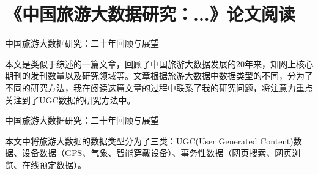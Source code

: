 \documentclass[10pt]{beamer}
\begin{document}
\section{《中国旅游大数据研究：...》论文阅读}%
\begin{frame}{\normalsize{中国旅游大数据研究：二十年回顾与展望}}
    \par 本文是类似于综述的一篇文章，回顾了中国旅游大数据发展的20年来，知网上核心期刊的发刊数量以及研究领域等。文章根据旅游大数据中数据类型的不同，分为了不同的研究方法，我在阅读这篇文章的过程中联系了我的研究问题，将注意力重点关注到了UGC数据的研究方法中。
\end{frame}
\begin{frame}{\normalsize{中国旅游大数据研究：二十年回顾与展望}}
\small{本文中将旅游大数据的数据类型分为了三类：UGC(User Generated Content)数据、设备数据（GPS、气象、智能穿戴设备）、事务性数据（网页搜索、网页浏览、在线预定数据）。

}
\end{frame}
\end{document}
